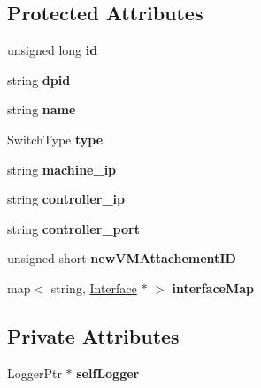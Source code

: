\subsection*{\-Protected \-Attributes}
\begin{DoxyCompactItemize}
\item 
\hypertarget{classSwitch_a0cfd5e0c8eace4d18f7fb55677e596fc}{unsigned long {\bfseries id}}\label{classSwitch_a0cfd5e0c8eace4d18f7fb55677e596fc}

\item 
\hypertarget{classSwitch_a0529a711159d27857d4352b7917f2c4a}{string {\bfseries dpid}}\label{classSwitch_a0529a711159d27857d4352b7917f2c4a}

\item 
\hypertarget{classSwitch_af7ec03da67ac27276af2ca2f5fc8ddd9}{string {\bfseries name}}\label{classSwitch_af7ec03da67ac27276af2ca2f5fc8ddd9}

\item 
\hypertarget{classSwitch_afd838e148f43d4c532ca62f9ec10cada}{\-Switch\-Type {\bfseries type}}\label{classSwitch_afd838e148f43d4c532ca62f9ec10cada}

\item 
\hypertarget{classSwitch_ade7fe6528530bbc889df73e2627bc4ce}{string {\bfseries machine\-\_\-ip}}\label{classSwitch_ade7fe6528530bbc889df73e2627bc4ce}

\item 
\hypertarget{classSwitch_ac0e8edd3aa68f8610b851d2bd1dc1dc5}{string {\bfseries controller\-\_\-ip}}\label{classSwitch_ac0e8edd3aa68f8610b851d2bd1dc1dc5}

\item 
\hypertarget{classSwitch_a73c93f9a7c05797b3259ecf7dddd50ab}{string {\bfseries controller\-\_\-port}}\label{classSwitch_a73c93f9a7c05797b3259ecf7dddd50ab}

\item 
\hypertarget{classSwitch_a803e0134f15b79149f6e25bfbf06382a}{unsigned short {\bfseries new\-V\-M\-Attachement\-I\-D}}\label{classSwitch_a803e0134f15b79149f6e25bfbf06382a}

\item 
\hypertarget{classSwitch_aa20a2632ba87301910667da3e23de09a}{map$<$ string, \hyperlink{classInterface}{\-Interface} $\ast$ $>$ {\bfseries interface\-Map}}\label{classSwitch_aa20a2632ba87301910667da3e23de09a}

\end{DoxyCompactItemize}
\subsection*{\-Private \-Attributes}
\begin{DoxyCompactItemize}
\item 
\hypertarget{classSwitch_ae3e4e003e0b8aa8ff91815653c2a3427}{\-Logger\-Ptr $\ast$ {\bfseries self\-Logger}}\label{classSwitch_ae3e4e003e0b8aa8ff91815653c2a3427}

\end{DoxyCompactItemize}
